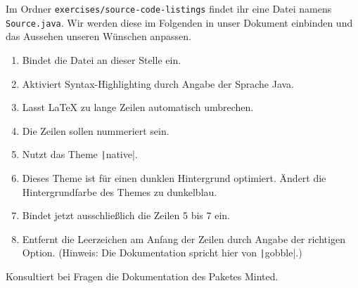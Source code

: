 Im Ordner \texttt{exercises/source-code-listings} findet ihr eine Datei namens \texttt{Source.java}.
Wir werden diese im Folgenden in unser Dokument einbinden und das Aussehen unseren Wünschen anpassen.

\begin{enumerate}
  \item Bindet die Datei an dieser Stelle ein.
  \item Aktiviert Syntax-Highlighting durch Angabe der Sprache Java.
  \item Lasst LaTeX zu lange Zeilen automatisch umbrechen.
  \item Die Zeilen sollen nummeriert sein.
  \item Nutzt das Theme \texttt|native|.
  \item Dieses Theme ist für einen dunklen Hintergrund optimiert. Ändert die Hintergrundfarbe des Themes zu dunkelblau.
  \item Bindet jetzt ausschließlich die Zeilen 5 bis 7 ein.
  \item Entfernt die Leerzeichen am Anfang der Zeilen durch Angabe der richtigen Option. (Hinweis: Die Dokumentation spricht hier von \texttt|gobble|.)
\end{enumerate}

Konsultiert bei Fragen die Dokumentation des Paketes Minted.

\usemintedstyle{} %

